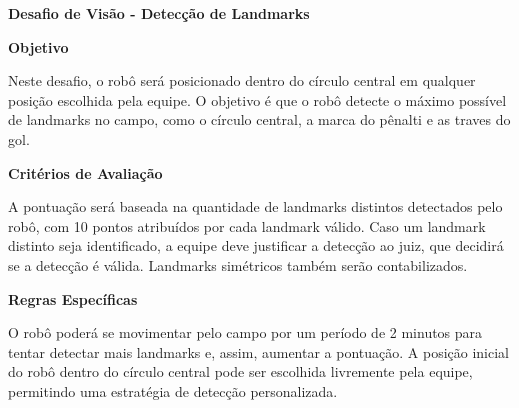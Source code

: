 \clearpage
\sffamily
{\bfseries\color[rgb]{0.4,0.4,0.4}Desafio de Visão - Detecção de Landmarks}
{}

\bigskip

{\bfseries Objetivo}

\headlinebox

Neste desafio, o robô será posicionado dentro do círculo central em qualquer posição escolhida pela equipe. O objetivo é que o robô detecte o máximo possível de landmarks no campo, como o círculo central, a marca do pênalti e as traves do gol.

\bigskip

{\bfseries Critérios de Avaliação}

\headlinebox

A pontuação será baseada na quantidade de landmarks distintos detectados pelo robô, com 10 pontos atribuídos por cada landmark válido. Caso um landmark distinto seja identificado, a equipe deve justificar a detecção ao juiz, que decidirá se a detecção é válida. Landmarks simétricos também serão contabilizados.

\bigskip

{\bfseries Regras Específicas}

\headlinebox

O robô poderá se movimentar pelo campo por um período de 2 minutos para tentar detectar mais landmarks e, assim, aumentar a pontuação. A posição inicial do robô dentro do círculo central pode ser escolhida livremente pela equipe, permitindo uma estratégia de detecção personalizada.